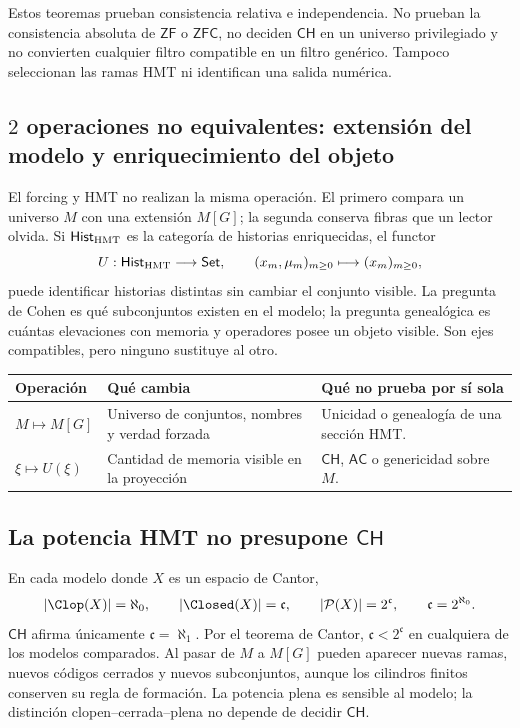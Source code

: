 \begin{remark}
Estos teoremas prueban consistencia relativa e independencia. No prueban la
consistencia absoluta de \(\mathsf{ZF}\) o \(\mathsf{ZFC}\), no deciden
\(\mathsf{CH}\) en un universo privilegiado y no convierten cualquier filtro
compatible en un filtro genérico. Tampoco seleccionan las ramas HMT ni
identifican una salida numérica.
\end{remark}

\subsection{\(2\) operaciones no equivalentes: extensión del modelo y enriquecimiento del objeto}

El forcing y HMT no realizan la misma operación. El primero compara un
universo \(M\) con una extensión \(M[G]\); la segunda conserva fibras que un
lector olvida. Si \(\mathsf{Hist}_{\rm HMT}\) es la categoría de historias
enriquecidas, el functor
\[
  U:\mathsf{Hist}_{\rm HMT}\longrightarrow\mathsf{Set},
  \qquad
  (x_m,\mu_m)_{m\ge0}\longmapsto(x_m)_{m\ge0},
\]
puede identificar historias distintas sin cambiar el conjunto visible. La
pregunta de Cohen es qué subconjuntos existen en el modelo; la pregunta
genealógica es cuántas elevaciones con memoria y operadores posee un objeto
visible. Son ejes compatibles, pero ninguno sustituye al otro.

\begin{center}
\begin{tabularx}{.94\textwidth}{>{\bfseries}p{}XX}
\toprule
Operación & Qué cambia & Qué no prueba por sí sola\\
\midrule
\(M\mapsto M[G]\) & Universo de conjuntos, nombres y verdad forzada &
Unicidad o genealogía de una sección HMT.\\
\(\xi\mapsto U(\xi)\) & Cantidad de memoria visible en la proyección &
\(\mathsf{CH}\), \(\mathsf{AC}\) o genericidad sobre \(M\).\\
\bottomrule
\end{tabularx}
\end{center}

\subsection{La potencia HMT no presupone \texorpdfstring{\(\mathsf{CH}\)}{CH}}

En cada modelo donde \(X\) es un espacio de Cantor,
\[
  |\Clop(X)|=\aleph_0,\qquad
  |\Closed(X)|=\mathfrak c,\qquad
  |\mathcal P(X)|=2^{\mathfrak c},
  \qquad \mathfrak c=2^{\aleph_0}.
\]
\(\mathsf{CH}\) afirma únicamente \(\mathfrak c=\aleph_1\). Por el teorema
de Cantor, \(\mathfrak c<2^{\mathfrak c}\) en cualquiera de los modelos
comparados. Al pasar de \(M\) a \(M[G]\) pueden aparecer nuevas ramas, nuevos
códigos cerrados y nuevos subconjuntos, aunque los cilindros finitos
conserven su regla de formación. La potencia plena es sensible al modelo; la
distinción clopen--cerrada--plena no depende de decidir \(\mathsf{CH}\).


